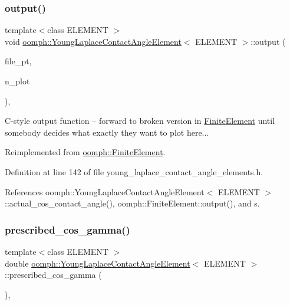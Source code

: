 \subsubsection{\texorpdfstring{output()}{output()}\hspace{0.1cm}{\footnotesize\ttfamily [4/4]}}
{\footnotesize\ttfamily template$<$class E\+L\+E\+M\+E\+NT $>$ \\
void \hyperlink{classoomph_1_1YoungLaplaceContactAngleElement}{oomph\+::\+Young\+Laplace\+Contact\+Angle\+Element}$<$ E\+L\+E\+M\+E\+NT $>$\+::output (\begin{DoxyParamCaption}\item[{F\+I\+LE $\ast$}]{file\+\_\+pt,  }\item[{const unsigned \&}]{n\+\_\+plot }\end{DoxyParamCaption})\hspace{0.3cm}{\ttfamily [inline]}, {\ttfamily [virtual]}}



C-\/style output function -- forward to broken version in \hyperlink{classoomph_1_1FiniteElement}{Finite\+Element} until somebody decides what exactly they want to plot here... 



Reimplemented from \hyperlink{classoomph_1_1FiniteElement_adfaee690bb0608f03320eeb9d110d48c}{oomph\+::\+Finite\+Element}.



Definition at line 142 of file young\+\_\+laplace\+\_\+contact\+\_\+angle\+\_\+elements.\+h.



References oomph\+::\+Young\+Laplace\+Contact\+Angle\+Element$<$ E\+L\+E\+M\+E\+N\+T $>$\+::actual\+\_\+cos\+\_\+contact\+\_\+angle(), oomph\+::\+Finite\+Element\+::output(), and s.

\mbox{\label{classoomph_1_1YoungLaplaceContactAngleElement_a7c48ab9660cdd1db7cda9fedcbae6bb9}} 
\subsubsection{\texorpdfstring{prescribed\+\_\+cos\+\_\+gamma()}{prescribed\_cos\_gamma()}}
{\footnotesize\ttfamily template$<$class E\+L\+E\+M\+E\+NT $>$ \\
double \hyperlink{classoomph_1_1YoungLaplaceContactAngleElement}{oomph\+::\+Young\+Laplace\+Contact\+Angle\+Element}$<$ E\+L\+E\+M\+E\+NT $>$\+::prescribed\+\_\+cos\+\_\+gamma (\begin{DoxyParamCaption}{ }\end{DoxyParamCaption})\hspace{0.3cm}{\ttfamily [inline]}, {\ttfamily [protected]}}



